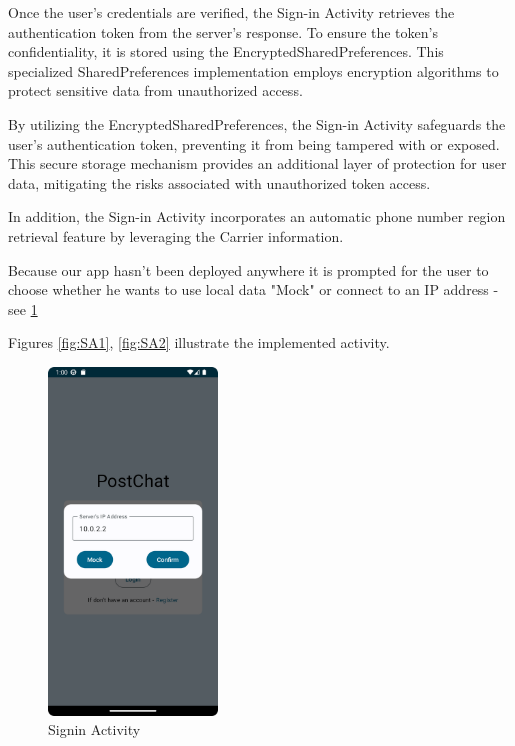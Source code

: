 Once the user's credentials are verified, the Sign-in Activity retrieves the authentication token from the server's response. To ensure the token's confidentiality, it is stored using the EncryptedSharedPreferences. This specialized SharedPreferences implementation employs encryption algorithms to protect sensitive data from unauthorized access.

By utilizing the EncryptedSharedPreferences, the Sign-in Activity safeguards the user's authentication token, preventing it from being tampered with or exposed. This secure storage mechanism provides an additional layer of protection for user data, mitigating the risks associated with unauthorized token access.


In addition, the Sign-in Activity incorporates an automatic phone number region retrieval feature by leveraging the Carrier information.

Because our app hasn't been deployed anywhere it is prompted for the user to choose whether he wants to use local data "Mock" or connect to an IP address - see \ref{fig:SAIP}

Figures \ref{fig:SA1}, \ref{fig:SA2} illustrate the implemented activity.

\begin{figure}[!ht]
	\centering
	\includegraphics[trim={0cm -3cm 0 -3cm}, width=0.4\textwidth]{./Chapter6/Figures/SignInActivityIpAdress}
	\caption{Signin Activity}
	\label{fig:SAIP}
\end{figure}


